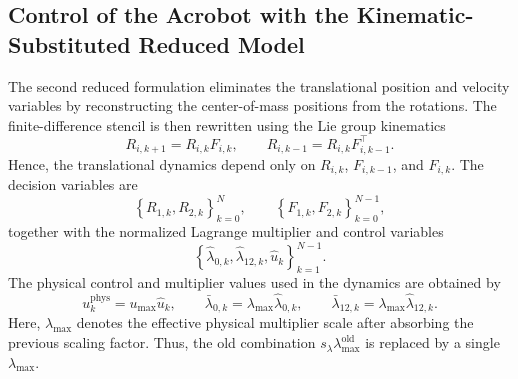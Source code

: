 \newpage


\subsection{Control of the Acrobot with the Kinematic-Substituted Reduced Model}
\label{sec:control_acrobot_reduced_model2}

The second reduced formulation eliminates the translational position and velocity
variables by reconstructing the center-of-mass positions from the rotations. The
finite-difference stencil is then rewritten using the Lie group kinematics
\[
    R_{i,k+1}=R_{i,k}F_{i,k},
    \qquad
    R_{i,k-1}=R_{i,k}F_{i,k-1}^{\top}.
\]
Hence, the translational dynamics depend only on
\(R_{i,k}\), \(F_{i,k-1}\), and \(F_{i,k}\). The decision variables are
\[
\left\{
R_{1,k},R_{2,k}
\right\}_{k=0}^{N},
\qquad
\left\{
F_{1,k},F_{2,k}
\right\}_{k=0}^{N-1},
\]
together with the normalized Lagrange multiplier and control variables
\[
\left\{
\hat\lambda_{0,k},\hat\lambda_{12,k},\hat u_k
\right\}_{k=1}^{N-1}.
\]
The physical control and multiplier values used in the dynamics are obtained by
\[
u_k^{\mathrm{phys}}
=
u_{\max}\hat u_k,
\qquad
\bar{\lambda}_{0,k}
=
\lambda_{\max}\hat\lambda_{0,k},
\qquad
\bar{\lambda}_{12,k}
=
\lambda_{\max}\hat\lambda_{12,k}.
\]
Here, \(\lambda_{\max}\) denotes the effective physical multiplier scale after
absorbing the previous scaling factor. Thus, the old combination
\(s_\lambda\lambda_{\max}^{\mathrm{old}}\) is replaced by a single
\(\lambda_{\max}\).

